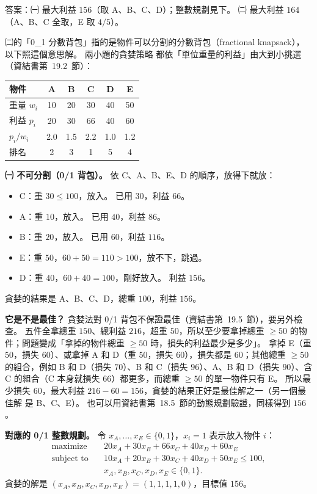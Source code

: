 \begin{pastsoln}
答案：㈠ 最大利益 $156$（取 A、B、C、D）；整數規劃見下。 ㈡ 最大利益 $164$（A、B、C 全取，E 取 $4/5$）。

㈡的「0\_1 分數背包」指的是物件可以分割的分數背包（fractional knapsack），以下照這個意思解。 兩小題的貪婪策略
都依「單位重量的利益」由大到小挑選（資結書第~19.2~節）：
\begin{center}
\begin{tabular}{lccccc}
\toprule
物件 & A & B & C & D & E \\
\midrule
重量 $w_i$ & 10 & 20 & 30 & 40 & 50 \\
利益 $p_i$ & 20 & 30 & 66 & 40 & 60 \\
$p_i / w_i$ & 2.0 & 1.5 & 2.2 & 1.0 & 1.2 \\
排名 & 2 & 3 & 1 & 5 & 4 \\
\bottomrule
\end{tabular}
\end{center}

\textbf{㈠ 不可分割（0/1 背包）。} 依 C、A、B、E、D 的順序，放得下就放：
\begin{itemize}
\item C：重 $30 \le 100$，放入。 已用 $30$，利益 $66$。
\item A：重 $10$，放入。 已用 $40$，利益 $86$。
\item B：重 $20$，放入。 已用 $60$，利益 $116$。
\item E：重 $50$，$60 + 50 = 110 > 100$，放不下，跳過。
\item D：重 $40$，$60 + 40 = 100$，剛好放入。 利益 $156$。
\end{itemize}
貪婪的結果是 A、B、C、D，總重 $100$，利益 $156$。

\textbf{它是不是最佳？} 貪婪法對 0/1 背包不保證最佳（資結書第~19.5~節），要另外檢查。 五件全拿總重 $150$、總利益
$216$，超重 $50$，所以至少要拿掉總重 $\ge 50$ 的物件；問題變成「拿掉的物件總重 $\ge 50$ 時，損失的利益最少是多少」。
拿掉 E（重 $50$，損失 $60$）、或拿掉 A 和 D（重 $50$，損失 $60$），損失都是 $60$；其他總重 $\ge 50$ 的組合，例如
B 和 D（損失 $70$）、B 和 C（損失 $96$）、A、B 和 D（損失 $90$）、含 C 的組合（C 本身就損失 $66$）都更多，而總重
$\ge 50$ 的單一物件只有 E。 所以最少損失 $60$，最大利益 $216 - 60 = 156$，貪婪的結果正好是最佳解之一（另一個最佳解
是 B、C、E）。 也可以用資結書第~18.5~節的動態規劃驗證，同樣得到 $156$。

\textbf{對應的 0/1 整數規劃。} 令 $x_A, \ldots, x_E \in \{0, 1\}$，$x_i = 1$ 表示放入物件 $i$：
\begin{align*}
\text{maximize}\quad & 20x_A + 30x_B + 66x_C + 40x_D + 60x_E \\
\text{subject to}\quad & 10x_A + 20x_B + 30x_C + 40x_D + 50x_E \le 100, \\
& x_A, x_B, x_C, x_D, x_E \in \{0, 1\}.
\end{align*}
貪婪的解是 $(x_A, x_B, x_C, x_D, x_E) = (1, 1, 1, 1, 0)$，目標值 $156$。


\end{pastsoln}
